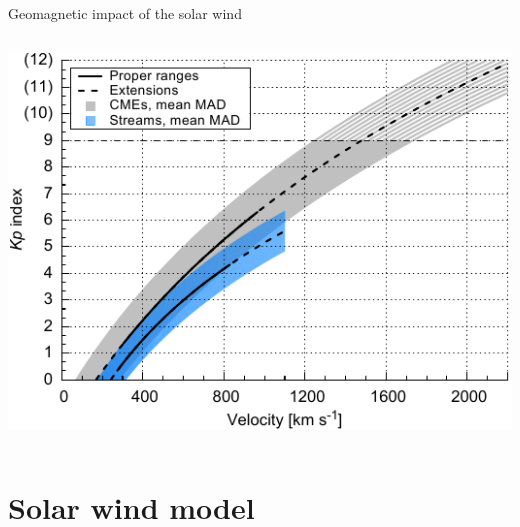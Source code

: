 \begin{frame}[plain,c]{Geomagnetic impact of the solar wind}{}
\begin{columns}[c]
		\includegraphics[width=\textwidth]{../figures_of_mine/chapter2/Kp_2dhistogram_V_sws123_fit_f3.pdf}
		
	\end{columns}
\end{frame}


\section{Solar wind model}

